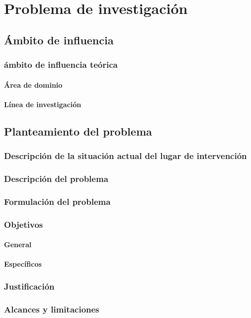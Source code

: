 \chapter{Problema de investigación}

\section{Ámbito de influencia}
	\subsection{ámbito de influencia teórica}
		\subsubsection{Área de dominio}
		\subsubsection{Línea de investigación}
\section{Planteamiento del problema}
	\subsection{Descripción de la situación actual del lugar de intervención}
	\subsection{Descripción del problema}
	\subsection{Formulación del problema}
	\subsection{Objetivos}
		\subsubsection{General}
		\subsubsection{Específicos}
	\subsection{Justificación}
	\subsection{Alcances y limitaciones}
	
	